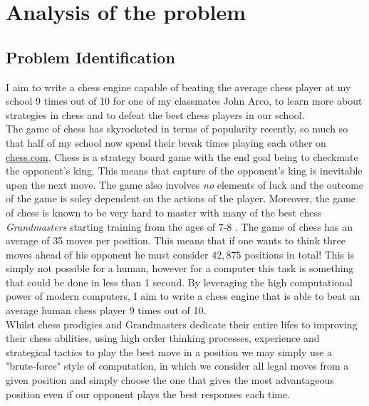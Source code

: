 \pagestyle{fancy}

\chapter{Analysis of the problem}

\section{Problem Identification}
I aim to write a chess engine capable of beating the 
average chess player at my school 9 times out of 10 for 
one of my classmates John Arco, to learn more about 
strategies in chess and to defeat the best chess players 
in our school.\\

The game of chess has skyrocketed in terms of popularity
recently, so much so that half of my school now spend their
break times playing each other on \url{chess.com}. Chess 
is a strategy board game with the end goal being to checkmate
the opponent's king. \cite{rules} This means that capture of 
the opponent's king is inevitable upon the next move. The 
game also involves \textit{no} elements of luck and the 
outcome of the game is soley dependent on the actions of the
player. Moreover, the game of chess is known to be very
hard to master with many of the best chess
\textit{Grandmasters} starting training from the
ages of 7-8 \cite{Magnus}. The game of chess has an average
of 35 moves \cite{branch} per position. This means that 
if one wants to think three moves ahead of his opponent
he must consider $42,875$ positions in total! This is
simply not possible for a human, however for a computer
this task is something that could be done in less than
1 second. By leveraging the high computational power
of modern computers, I aim to write a chess engine that
is able to beat an average human chess player 9 times
out of 10.\\

Whilst chess prodigies and Grandmasters dedicate their entire
lifes to improving their chess abilities, using high order 
thinking processes, experience and strategical tactics to play
the best move in a position we may simply use a "brute-force" 
style of computation, in which we consider all legal moves from a 
given position and simply choose the one that gives the most
advantageous position even if our opponent plays the best 
responses each time.\\

